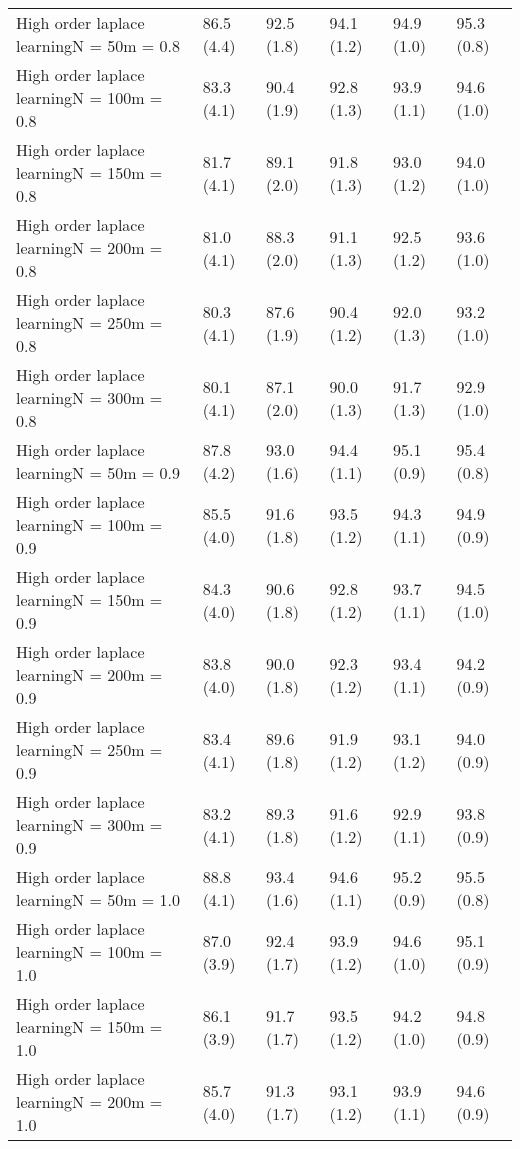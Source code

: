 \documentclass{article}
\begin{document}
\begin{table*}[t!]
\begin{center}
\begin{small}
\begin{sc}
\begin{tabular}{llllll}
High order laplace learningN = 50m = 0.8&86.5 (4.4)      &92.5 (1.8)      &94.1 (1.2)      &94.9 (1.0)      &95.3 (0.8)      \\
High order laplace learningN = 100m = 0.8&83.3 (4.1)      &90.4 (1.9)      &92.8 (1.3)      &93.9 (1.1)      &94.6 (1.0)      \\
High order laplace learningN = 150m = 0.8&81.7 (4.1)      &89.1 (2.0)      &91.8 (1.3)      &93.0 (1.2)      &94.0 (1.0)      \\
High order laplace learningN = 200m = 0.8&81.0 (4.1)      &88.3 (2.0)      &91.1 (1.3)      &92.5 (1.2)      &93.6 (1.0)      \\
High order laplace learningN = 250m = 0.8&80.3 (4.1)      &87.6 (1.9)      &90.4 (1.2)      &92.0 (1.3)      &93.2 (1.0)      \\
High order laplace learningN = 300m = 0.8&80.1 (4.1)      &87.1 (2.0)      &90.0 (1.3)      &91.7 (1.3)      &92.9 (1.0)      \\
High order laplace learningN = 50m = 0.9&87.8 (4.2)      &93.0 (1.6)      &94.4 (1.1)      &95.1 (0.9)      &95.4 (0.8)      \\
High order laplace learningN = 100m = 0.9&85.5 (4.0)      &91.6 (1.8)      &93.5 (1.2)      &94.3 (1.1)      &94.9 (0.9)      \\
High order laplace learningN = 150m = 0.9&84.3 (4.0)      &90.6 (1.8)      &92.8 (1.2)      &93.7 (1.1)      &94.5 (1.0)      \\
High order laplace learningN = 200m = 0.9&83.8 (4.0)      &90.0 (1.8)      &92.3 (1.2)      &93.4 (1.1)      &94.2 (0.9)      \\
High order laplace learningN = 250m = 0.9&83.4 (4.1)      &89.6 (1.8)      &91.9 (1.2)      &93.1 (1.2)      &94.0 (0.9)      \\
High order laplace learningN = 300m = 0.9&83.2 (4.1)      &89.3 (1.8)      &91.6 (1.2)      &92.9 (1.1)      &93.8 (0.9)      \\
High order laplace learningN = 50m = 1.0&88.8 (4.1)      &93.4 (1.6)      &94.6 (1.1)      &95.2 (0.9)      &95.5 (0.8)      \\
High order laplace learningN = 100m = 1.0&87.0 (3.9)      &92.4 (1.7)      &93.9 (1.2)      &94.6 (1.0)      &95.1 (0.9)      \\
High order laplace learningN = 150m = 1.0&86.1 (3.9)      &91.7 (1.7)      &93.5 (1.2)      &94.2 (1.0)      &94.8 (0.9)      \\
High order laplace learningN = 200m = 1.0&85.7 (4.0)      &91.3 (1.7)      &93.1 (1.2)      &93.9 (1.1)      &94.6 (0.9)      \\

\end{tabular}
\end{sc}
\end{small}
\end{center}
\end{table*}
\end{document}
